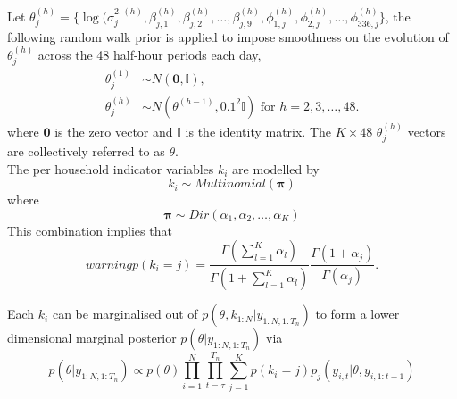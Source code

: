\documentclass[
12pt, %
onehalfspacing, %
nohyperref, %
headsepline, %
chapterinoneline, %
]{MastersDoctoralThesis} %
\begin{document}
Let $\theta^{(h)}_j = \{\log(\sigma^{2, (h)}_{j}, \beta_{j, 1}^{(h)}, \beta_{j, 2}^{(h)}, \ldots, \beta_{j, 9}^{(h)}, \phi_{1, j}^{(h)}, \phi_{2, j}^{(h)}, \ldots, \phi_{336, j}^{(h)}\}$, the following random walk prior is applied to impose smoothness on the evolution of $\theta^{(h)}_j$ across the 48 half-hour periods each day,
\begin{align}
\label{elec:dynamicPrior}
\theta^{(1)}_j &\sim N(\boldsymbol{0}, \mathbb{I}), \\
\theta^{(h)}_j &\sim N(\theta^{(h-1)}, 0.1^2 \mathbb{I}) \mbox{ for } h = 2, 3, \ldots, 48.
\end{align}
where $\boldsymbol{0}$ is the zero vector and $\mathbb{I}$ is the identity matrix.
The $K \times 48$ $\theta^{(h)}_j$ vectors are collectively referred to as $\theta$.
\\

The per household indicator variables $k_i$ are modelled by
\begin{equation} 
\label{elec:kConditional}
k_i \sim Multinomial(\boldsymbol{\pi})
\end{equation}
where 
\begin{equation}
\label{elec:piPrior}
\boldsymbol{\pi} \sim Dir(\alpha_1, \alpha_2, \ldots, \alpha_K)
\end{equation}
This combination implies that
\begin{equation}
\label{elec:kMarginal}warning
p(k_i = j) = \frac{\Gamma(\sum_{l=1}^K \alpha_l)}{\Gamma(1 + \sum_{l=1}^K \alpha_l)} \frac{\Gamma(1 + \alpha_j)}{\Gamma(\alpha_j)}.
\end{equation}


Each $k_i$ can be marginalised out of $p(\theta, k_{1:N} | y_{1:N, 1:T_n})$ to form a lower dimensional marginal posterior $p(\theta | y_{1:N, 1:T_n})$ via
\begin{equation}
p(\theta | y_{1:N, 1:T_n}) \propto p(\theta)  \prod_{i=1}^N\prod_{t=\tau}^{T_n}\sum_{j=1}^K p(k_i = j)p_{j}(y_{i, t} | \theta, y_{i, 1:t-1})
\end{equation}
\end{document}
